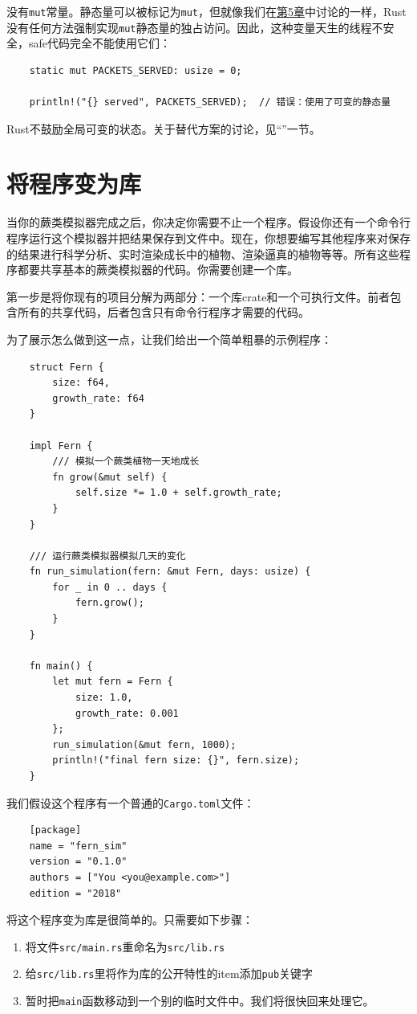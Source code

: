 没有\texttt{mut}常量。静态量可以被标记为\texttt{mut}，但就像我们在\hyperref[ch05]{第5章}中讨论的一样，Rust没有任何方法强制实现\texttt{mut}静态量的独占访问。因此，这种变量天生的线程不安全，safe代码完全不能使用它们：
\begin{verbatim}
    static mut PACKETS_SERVED: usize = 0;

    println!("{} served", PACKETS_SERVED);  // 错误：使用了可变的静态量
\end{verbatim}

Rust不鼓励全局可变的状态。关于替代方案的讨论，见“”一节。

\section{将程序变为库}

当你的蕨类模拟器完成之后，你决定你需要不止一个程序。假设你还有一个命令行程序运行这个模拟器并把结果保存到文件中。现在，你想要编写其他程序来对保存的结果进行科学分析、实时渲染成长中的植物、渲染逼真的植物等等。所有这些程序都要共享基本的蕨类模拟器的代码。你需要创建一个库。

第一步是将你现有的项目分解为两部分：一个库crate和一个可执行文件。前者包含所有的共享代码，后者包含只有命令行程序才需要的代码。

为了展示怎么做到这一点，让我们给出一个简单粗暴的示例程序：
\begin{verbatim}
    struct Fern {
        size: f64,
        growth_rate: f64
    }

    impl Fern {
        /// 模拟一个蕨类植物一天地成长
        fn grow(&mut self) {
            self.size *= 1.0 + self.growth_rate;
        }
    }

    /// 运行蕨类模拟器模拟几天的变化
    fn run_simulation(fern: &mut Fern, days: usize) {
        for _ in 0 .. days {
            fern.grow();
        }
    }

    fn main() {
        let mut fern = Fern {
            size: 1.0,
            growth_rate: 0.001
        };
        run_simulation(&mut fern, 1000);
        println!("final fern size: {}", fern.size);
    }
\end{verbatim}

我们假设这个程序有一个普通的\texttt{Cargo.toml}文件：
\begin{verbatim}
    [package]
    name = "fern_sim"
    version = "0.1.0"
    authors = ["You <you@example.com>"]
    edition = "2018"
\end{verbatim}

将这个程序变为库是很简单的。只需要如下步骤：
\begin{enumerate}
    \item 将文件\texttt{src/main.rs}重命名为\texttt{src/lib.rs}
    \item 给\texttt{src/lib.rs}里将作为库的公开特性的item添加\texttt{pub}关键字
    \item 暂时把\texttt{main}函数移动到一个别的临时文件中。我们将很快回来处理它。
\end{enumerate}

